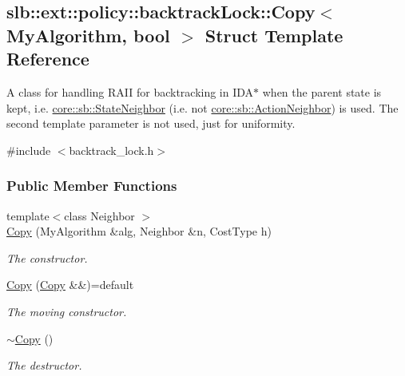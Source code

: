\hypertarget{structslb_1_1ext_1_1policy_1_1backtrackLock_1_1Copy}{}\subsection{slb\+:\+:ext\+:\+:policy\+:\+:backtrack\+Lock\+:\+:Copy$<$ My\+Algorithm, bool $>$ Struct Template Reference}
\label{structslb_1_1ext_1_1policy_1_1backtrackLock_1_1Copy}


A class for handling R\+A\+II for backtracking in I\+D\+A$\ast$ when the parent state is kept, i.\+e. \hyperlink{structslb_1_1core_1_1sb_1_1StateNeighbor}{core\+::sb\+::\+State\+Neighbor} (i.\+e. not \hyperlink{structslb_1_1core_1_1sb_1_1ActionNeighbor}{core\+::sb\+::\+Action\+Neighbor}) is used. The second template parameter is not used, just for uniformity.  




{\ttfamily \#include $<$backtrack\+\_\+lock.\+h$>$}

\subsubsection*{Public Member Functions}
\begin{DoxyCompactItemize}
\item 
{\footnotesize template$<$class Neighbor $>$ }\\\hyperlink{structslb_1_1ext_1_1policy_1_1backtrackLock_1_1Copy_a1c7ae651145c47ac6fe8211f7486fcf2}{Copy} (My\+Algorithm \&alg, Neighbor \&n, Cost\+Type h)
\begin{DoxyCompactList}\small\item\em The constructor. \end{DoxyCompactList}\item 
\hyperlink{structslb_1_1ext_1_1policy_1_1backtrackLock_1_1Copy_ac762b21abbfb3b2d3fd8c74cf5f3f22c}{Copy} (\hyperlink{structslb_1_1ext_1_1policy_1_1backtrackLock_1_1Copy}{Copy} \&\&)=default\hypertarget{structslb_1_1ext_1_1policy_1_1backtrackLock_1_1Copy_ac762b21abbfb3b2d3fd8c74cf5f3f22c}{}\label{structslb_1_1ext_1_1policy_1_1backtrackLock_1_1Copy_ac762b21abbfb3b2d3fd8c74cf5f3f22c}

\begin{DoxyCompactList}\small\item\em The moving constructor. \end{DoxyCompactList}\item 
\hyperlink{structslb_1_1ext_1_1policy_1_1backtrackLock_1_1Copy_a96a2c432f054f03b79bd926257ca5484}{$\sim$\+Copy} ()\hypertarget{structslb_1_1ext_1_1policy_1_1backtrackLock_1_1Copy_a96a2c432f054f03b79bd926257ca5484}{}\label{structslb_1_1ext_1_1policy_1_1backtrackLock_1_1Copy_a96a2c432f054f03b79bd926257ca5484}

\begin{DoxyCompactList}\small\item\em The destructor. \end{DoxyCompactList}\end{DoxyCompactItemize}
